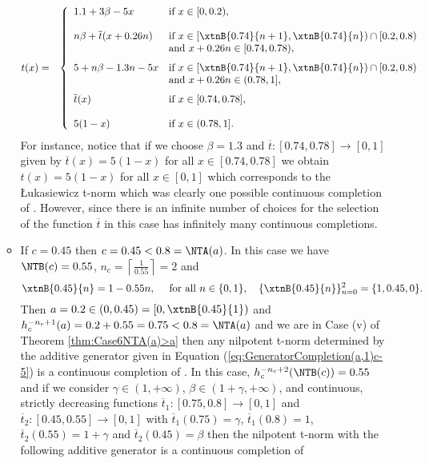 \begin{example}
\begin{itemize}
\begin{itemize}
			\begin{eqnarray*}\label{eq:ExapleGenGen(iv)-inf}
				t(x)
				&=&
				\left\{ \begin{array}{ll}
					1.1+3\beta-5x & \text{if } x \in [0,0.2), \\
					& \\
					n\beta + \overline{t}(x+0.26n)  & \text{if } x \in [\xtnB{0.74}{n+1},\xtnB{0.74}{n}) \cap [0.2,0.8) \\
					& \text{and } x+0.26n \in [0.74,0.78), \\[7pt]
					5+n\beta - 1.3n -5x & \text{if } x \in [\xtnB{0.74}{n+1},\xtnB{0.74}{n}) \cap [0.2,0.8)\\
					& \text{and } x+0.26n \in (0.78,1], \\[7pt]
					\overline{t}(x) & \text{if } x \in [0.74,0.78], \\
					& \\
					5(1-x) & \text{if } x \in (0.78,1].
				\end{array} \right.
			\end{eqnarray*}
			For instance, notice that if we choose $\beta=1.3$ and $\overline{t}:[0.74,0.78] \to [0,1]$ given by $\overline{t}(x)=5(1-x)$ for all  $x \in [0.74,0.78]$ we obtain $t(x)=5(1-x)$ for all $x \in [0,1]$ which corresponds to the Łukasiewicz t-norm which was clearly one possible continuous completion of \TB. However, since there is an infinite number of choices for the selection of the function $\overline{t}$ in this case \TB has infinitely many continuous completions.		
			\item If $c=0.45$ then $c=0.45 < 0.8 = \NTA(a)$.  In this case we have $\NTB(c)=0.55$, $n_c = \left \lceil{\frac{1}{0.55}}\right \rceil = 2$ and
			$$\xtnB{0.45}{n}=1-0.55n, \quad \text{ for all } n \in \{0,1\}, \quad \{\xtnB{0.45}{n}\}_{n=0}^2 = \{1,0.45,0\}.$$
			Then  $a=0.2 \in (0,0.45) = [0,\xtnB{0.45}{1})$
			and $h_c^{-n_c+1}(a)=0.2+0.55=0.75<0.8=\NTA(a)$ and we are in Case (v) of Theorem \ref{thm:Case6NTA(a)>a} then any nilpotent t-norm determined by the additive generator given in Equation (\ref{eq:GeneratorCompletion(a,1)c-5}) is a continuous completion of \TB. In this case, $h_c^{-n_c+2}(\NTB(c))=0.55$ and if we consider $\gamma \in (1,+\infty)$, $\beta \in (1+\gamma,+\infty)$, and continuous, strictly decreasing functions $\overline{t}_1:[0.75,0.8] \to [0,1]$ and $\overline{t}_2:[0.45,0.55] \to [0,1]$ with $\overline{t}_1(0.75)=\gamma$, $\overline{t}_1(0.8)=1$, $\overline{t}_2(0.55)=1+\gamma$ and $\overline{t}_2(0.45)=\beta$  then the nilpotent t-norm with the following additive generator is a continuous completion of \TB
			

\end{itemize}
\end{itemize}
\end{example}
